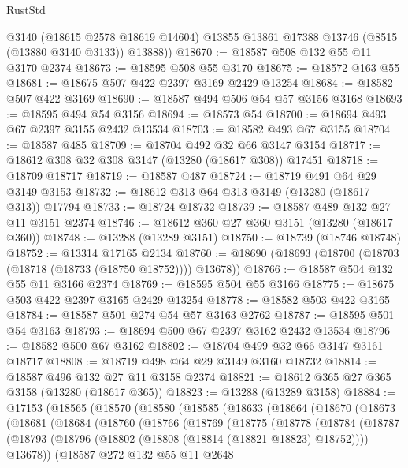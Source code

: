\begin{lexlean}{RustStd}
\begin{coremodule}
        @3140
        (@18615 @2578 @18619 @14604)
        @13855
        @13861
        @17388
        @13746
        (@8515 (@13880 @3140 @3133))
        @13888))
@18670 := @18587 @508 @132 @55 @11 @3170 @2374
@18673 := @18595 @508 @55 @3170
@18675 := @18572 @163 @55
@18681 := @18675 @507 @422 @2397 @3169 @2429 @13254
@18684 := @18582 @507 @422 @3169
@18690 := @18587 @494 @506 @54 @57 @3156 @3168
@18693 := @18595 @494 @54 @3156
@18694 := @18573 @54
@18700 := @18694 @493 @67 @2397 @3155 @2432 @13534
@18703 := @18582 @493 @67 @3155
@18704 := @18587 @485
@18709 := @18704 @492 @32 @66 @3147 @3154
@18717 := @18612 @308 @32 @308 @3147 (@13280 (@18617 @308)) @17451
@18718 := @18709 @18717
@18719 := @18587 @487
@18724 := @18719 @491 @64 @29 @3149 @3153
@18732 := @18612 @313 @64 @313 @3149 (@13280 (@18617 @313)) @17794
@18733 := @18724 @18732
@18739 := @18587 @489 @132 @27 @11 @3151 @2374
@18746 := @18612 @360 @27 @360 @3151 (@13280 (@18617 @360))
@18748 := @13288 (@13289 @3151)
@18750 := @18739 (@18746 @18748)
@18752 := @13314 @17165 @2134
@18760 := @18690 (@18693 (@18700 (@18703 (@18718 (@18733 (@18750 @18752)))) @13678))
@18766 := @18587 @504 @132 @55 @11 @3166 @2374
@18769 := @18595 @504 @55 @3166
@18775 := @18675 @503 @422 @2397 @3165 @2429 @13254
@18778 := @18582 @503 @422 @3165
@18784 := @18587 @501 @274 @54 @57 @3163 @2762
@18787 := @18595 @501 @54 @3163
@18793 := @18694 @500 @67 @2397 @3162 @2432 @13534
@18796 := @18582 @500 @67 @3162
@18802 := @18704 @499 @32 @66 @3147 @3161 @18717
@18808 := @18719 @498 @64 @29 @3149 @3160 @18732
@18814 := @18587 @496 @132 @27 @11 @3158 @2374
@18821 := @18612 @365 @27 @365 @3158 (@13280 (@18617 @365))
@18823 := @13288 (@13289 @3158)
@18884 := @17153
    (@18565
      (@18570
        (@18580
          (@18585
            (@18633
              (@18664
                (@18670
                  (@18673
                    (@18681
                      (@18684
                        (@18760
                          (@18766
                            (@18769
                              (@18775
                                (@18778
                                  (@18784
                                    (@18787
                                      (@18793
                                        (@18796 (@18802 (@18808 (@18814 (@18821 @18823) @18752))))
                                        @13678))
                                    (@18587
                                      @272
                                      @132
                                      @55
                                      @11
                                      @2648

\end{coremodule}
\end{lexlean}

